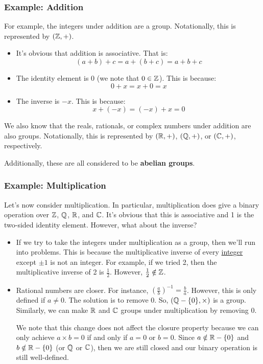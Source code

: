 \documentclass[letterpaper]{article}
\begin{document}
\subsubsection{Example: Addition}
For example, the integers under addition are a group. Notationally, this is represented by $(\mathbb{Z}, +)$. 
\begin{itemize}
    \item It's obvious that addition is associative. That is:
    \[(a + b) + c = a + (b + c) = a + b + c\]

    \item The identity element is 0 (we note that $0 \in \mathbb{Z}$). This is because:
    \[0 + x = x + 0 = x\]

    \item The inverse is $-x$. This is because:
    \[x + (-x) = (-x) + x = 0\]
\end{itemize}
We also know that the reals, rationals, or complex numbers under addition are also groups. Notationally, this is represented by $(\mathbb{R}, +)$, $(\mathbb{Q}, +)$, or $(\mathbb{C}, +)$, respectively. 

\bigskip 

Additionally, these are all considered to be \textbf{abelian groups}. 

\subsubsection{Example: Multiplication}
Let's now consider multiplication. In particular, multiplication does give a binary operation over $\mathbb{Z}$, $\mathbb{Q}$, $\mathbb{R}$, and $\mathbb{C}$. It's obvious that this is associative and 1 is the two-sided identity element. However, what about the inverse? 
\begin{itemize}
    \item If we try to take the integers under multiplication as a group, then we'll run into problems. This is because the multiplicative inverse of every \underline{integer} except $\pm 1$ is not an integer. For example, if we tried 2, then the multiplicative inverse of 2 is $\frac{1}{2}$. However, $\frac{1}{2} \notin \mathbb{Z}$.
    
    \item Rational numbers are closer. For instance, $\left(\frac{a}{b}\right)^{-1} = \frac{b}{a}$. However, this is only defined if $a \neq 0$. The solution is to remove 0. So, $(\mathbb{Q} - \{0\}, \times)$ is a group. Similarly, we can make $\mathbb{R}$ and $\mathbb{C}$ groups under multiplication by removing 0. 
    
    \bigskip 

    We note that this change does not affect the closure property because we can only achieve $a \times b = 0$ if and only if $a = 0$ or $b = 0$. Since $a \notin \mathbb{R} - \{0\}$ and $b \notin \mathbb{R} - \{0\}$ (or $\mathbb{Q}$ or $\mathbb{C}$), then we are still closed and our binary operation is still well-defined. 
\end{itemize}
\end{document}
